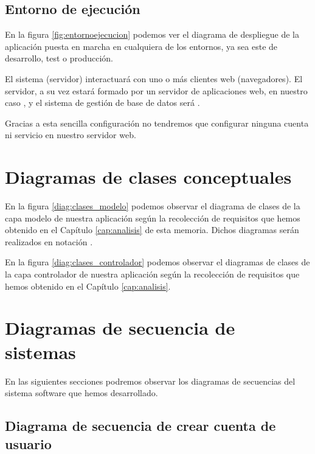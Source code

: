 \subsection{Entorno de ejecución}
En la figura \ref{fig:entornoejecucion} podemos ver el diagrama de despliegue de
la aplicación puesta en marcha en cualquiera de los entornos, ya sea este de
desarrollo, test o producción.

El sistema (servidor) interactuará con uno o más clientes web (navegadores). El
servidor, a su vez estará formado por un servidor de aplicaciones web, en
nuestro caso , y el sistema de gestión de base de datos será
.

Gracias a esta sencilla configuración no tendremos que configurar ninguna cuenta
ni servicio en nuestro servidor web.

\clearpage
\section{Diagramas de clases conceptuales}
En la figura \ref{diag:clases_modelo} podemos observar el diagrama de clases de
la capa modelo de nuestra aplicación según la recolección de requisitos que
hemos obtenido en el Capítulo \ref{cap:analisis} de esta memoria. Dichos
diagramas serán realizados en notación  \cite{uml:distilled_standard}.


\clearpage

En la figura \ref{diag:clases_controlador} podemos observar el diagramas de
clases de la capa controlador de nuestra aplicación según la recolección de
requisitos que hemos obtenido en el Capítulo \ref{cap:analisis}.


\section{Diagramas de secuencia de sistemas}

En las siguientes secciones podremos observar los diagramas de secuencias del
sistema software que hemos desarrollado.

\subsection*{Diagrama de secuencia de crear cuenta de usuario}

